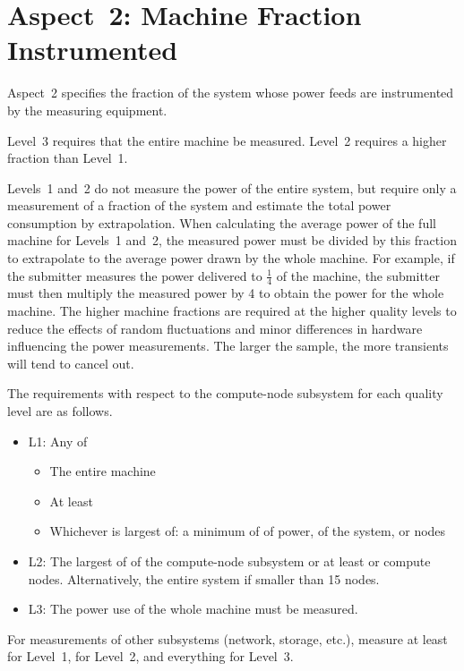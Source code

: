 \section{Aspect~2: Machine Fraction Instrumented}
\label{sec:A2MFI}
\noindent
Aspect~2 specifies the fraction of the system whose power feeds are instrumented by the measuring equipment.
\wl

\noindent
Level~3 requires that the entire machine be measured.
Level~2 requires a higher fraction than Level~1.
\wl

\noindent
Levels~1 and~2 do not measure the power of the entire system, but require only a measurement of a fraction of the system and estimate the total power consumption by extrapolation.
When calculating the average power of the full machine for Levels~1 and~2, the measured power must be divided by this fraction to extrapolate to the average power drawn by the whole machine.
For example, if the submitter measures the power delivered to $ \frac{1}{4} $ of the machine, the submitter must then multiply the measured power by 4 to obtain the power for the whole machine.
The higher machine fractions are required at the higher quality levels to reduce the effects of random fluctuations and minor differences in hardware influencing the power measurements.
The larger the sample, the more transients will tend to cancel out.
\wl

\noindent
The requirements with respect to the compute-node subsystem for each quality level are as follows.

\begin{itemize}
\item
L1: Any of
\begin{itemize}
\item The entire machine
\item At least \SpecPowerMaxLOne{}
\item Whichever is largest of: a minimum of \SpecPowerMinLOne{} of power, \SpecFracMinLOne{} of the system, or \SpecMinNodes{} nodes
\end{itemize}

\item
L2: The largest of \SpecFracMinLTwo{} of the compute-node subsystem or at least \SpecPowerMinLTwo{} or \SpecMinNodes{} compute nodes.
Alternatively, the entire system if smaller than 15 nodes.
\item
L3: The power use of the whole machine must be measured.
\end{itemize}

\noindent
For measurements of other subsystems (network, storage, etc.), measure at least \SpecFracMinLOne{} for Level~1, \SpecFracMinLTwo{} for Level~2, and everything for Level~3.
\wl

